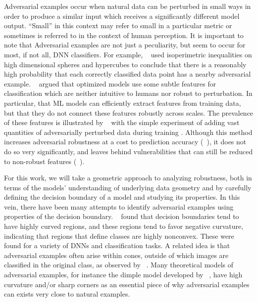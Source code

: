 Adversarial examples occur when natural data can be perturbed in small
ways in order to produce a similar input which receives a
significantly different model output. ``Small'' in this context may
refer to small in a particular metric or sometimes is referred to in
the context of human perception. It is important to note that Adversarial
examples are not just a peculiarity, but seem to occur for most, if
not all, DNN  classifiers. For example, ~\cite{inevitable2018} used
isoperimetric inequalities on high dimensional spheres and hypercubes
to conclude that there is a reasonably high probability that each
correctly classified data point has a nearby adversarial
example. ~\cite{ilyas2019adversarial} argued that optimized models use
some subtle features for classification which are neither intuitive to
humans nor robust to perturbation. In particular, that ML models can
efficiently extract features from training data, but that they do not
connect these features robustly across scales. The prevalence of these
features is illustrated by ~\cite{madry2018towards} with the simple experiment of adding vast
quantities of adversarially perturbed data during training
. Although this method increases
adversarial robustness at a cost to prediction accuracy (~\cite{tsipras2018robustness}), it does not
do so very significantly, and leaves behind vulnerabilities that can
still be reduced to non-robust features (~\cite{inevitable2018}). 


For this work, we will take a geometric approach to analyzing 
robustness, both in terms of the models' understanding of underlying
data geometry and by carefully defining the decision boundary of a
model and studying its properties. In this vein, there have been many
attempts to identify adversarial examples using properties of the
decision boundary.  ~\cite{Fawzi2018empirical} found that decision
boundaries tend to have highly curved regions, and these regions tend
to favor negative curvature, indicating that regions that define
classes are highly nonconvex. These were found for a variety of DNNs
and classification  tasks. 
A related idea is that adversarial examples often arise within cones, outside of which images are classified in the original class, as observed by ~\cite{roth19aodds}. Many theoretical models of adversarial examples, for instance the dimple model developed by ~\cite{shamir2021}, have high curvature and/or sharp corners as an essential piece of why adversarial examples can exists very close to natural examples.


